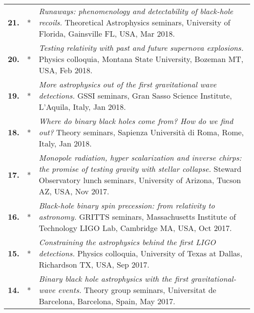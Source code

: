 \documentclass[11pt,letterpaper,sans]{moderncv}   %
\begin{document}
{\begin{longtable}{rp{0.4cm}p{15.8cm}}
%
\textbf{21.} & *& \textit{Runaways: phenomenology and detectability of black-hole recoils.}
\newline{} 
Theoretical Astrophysics seminars, University of Florida, Gainsville FL, USA, Mar 2018.
\vspace{0.05cm}\\
%
\textbf{20.} & *& \textit{Testing relativity with past and future supernova explosions.}
\newline{} 
Physics colloquia, Montana State University, Bozeman MT, USA, Feb 2018.
\vspace{0.05cm}\\
%
\textbf{19.} & *& \textit{More astrophysics out of the first gravitational wave detections.}
\newline{} 
GSSI seminars, Gran Sasso Science Institute, L'Aquila, Italy, Jan 2018.
\vspace{0.05cm}\\
%
\textbf{18.} & *& \textit{Where do binary black holes come from? How do we find out?}
\newline{} 
Theory seminars, Sapienza Universit\`a di Roma, Rome, Italy, Jan 2018.
\vspace{0.05cm}\\
%
\textbf{17.} & *& \textit{Monopole radiation, hyper scalarization and inverse chirps: the promise of testing gravity with stellar collapse.}
\newline{} 
Steward Observatory lunch seminars, University of Arizona, Tucson AZ, USA, Nov 2017.
\vspace{0.05cm}\\
%
\textbf{16.} & *& \textit{Black-hole binary spin precession: from relativity to astronomy.}
\newline{} 
GRITTS seminars, Massachusetts Institute of Technology LIGO Lab, Cambridge MA, USA, Oct 2017.
\vspace{0.05cm}\\
%
\textbf{15.} & *& \textit{Constraining the astrophysics behind the first LIGO detections.}
\newline{} 
Physics colloquia, University of Texas at Dallas, Richardson TX, USA, Sep 2017.
\vspace{0.05cm}\\
%
\textbf{14.} & *& \textit{Binary black hole astrophysics with the first gravitational-wave events.}
\newline{} 
Theory group seminars, Universitat de Barcelona, Barcelona, Spain, May 2017.
\vspace{0.05cm}\\

\end{longtable}}
\end{document}
